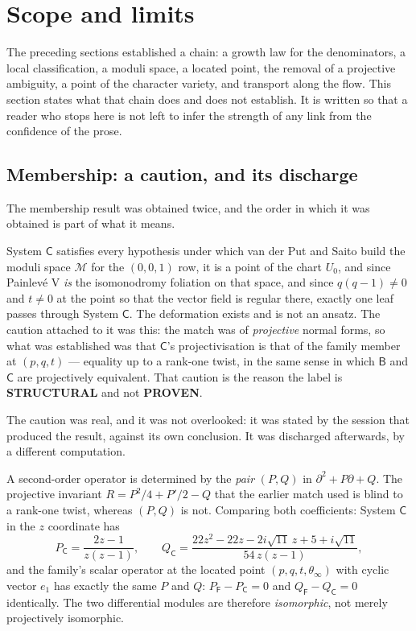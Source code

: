 \section{Scope and limits}\label{sec:limits}

The preceding sections established a chain: a growth law for the denominators,
a local classification, a moduli space, a located point, the removal of a
projective ambiguity, a point of the character variety, and transport along the
flow. This section states what that chain does and does not establish. It is
written so that a reader who stops here is not left to infer the strength of
any link from the confidence of the prose.

\subsection{Membership: a caution, and its discharge}\label{ssec:verdict}

The membership result was obtained twice, and the order in which it was
obtained is part of what it means.

\begin{remark}
System $\mathsf C$ satisfies every hypothesis under which van der Put and Saito
build the moduli space $\mathcal M$ for the $(0,0,1)$ row, it is a point of the
chart $U_0$, and since Painlev\'e V \emph{is} the isomonodromy foliation on
that space, and since $q(q-1)\neq0$ and $t\neq0$ at the point so that the
vector field is regular there, exactly one leaf passes through System
$\mathsf C$. The deformation exists and is not an ansatz. The caution attached
to it was this: the match was of \emph{projective} normal forms, so what was
established was that $\mathsf C$'s projectivisation is that of the family
member at $(p,q,t)$ --- equality up to a rank-one twist, in the same sense in
which $\mathsf B$ and $\mathsf C$ are projectively equivalent. That caution is
the reason the label is \textbf{STRUCTURAL} and not \textbf{PROVEN}.
\end{remark}

The caution was real, and it was not overlooked: it was stated by the session
that produced the result, against its own conclusion. It was discharged
afterwards, by a different computation.

\begin{remark}
A second-order operator is determined by the \emph{pair} $(P,Q)$ in
$\partial^2+P\partial+Q$. The projective invariant
$R=P^2/4+P'/2-Q$ that the earlier match used is blind to a rank-one twist,
whereas $(P,Q)$ is not. Comparing both coefficients: System $\mathsf C$ in the
$z$ coordinate has
\[
  P_{\mathsf C}=\frac{2z-1}{z(z-1)},\qquad
  Q_{\mathsf C}=\frac{22z^{2}-22z-2i\sqrt{11}\,z+5+i\sqrt{11}}{54\,z(z-1)},
\]
and the family's scalar operator at the located point $(p,q,t,\theta_\infty)$
with cyclic vector $e_1$ has exactly the same $P$ and $Q$:
$P_{\mathsf F}-P_{\mathsf C}=0$ and $Q_{\mathsf F}-Q_{\mathsf C}=0$
identically. The two differential modules are therefore \emph{isomorphic}, not
merely projectively isomorphic.
\end{remark}

